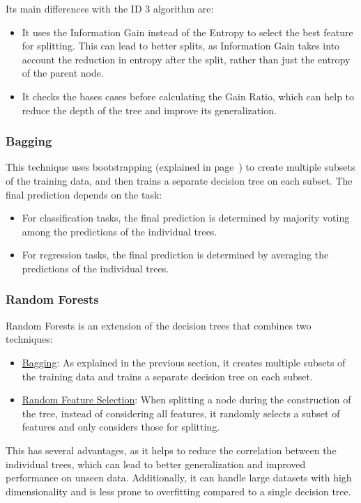 Its main differences with the ID 3 algorithm are:
\begin{itemize}
    \item It uses the Information Gain instead of the Entropy to select the best feature for splitting. This can lead to better splits, as Information Gain takes into account the reduction in entropy after the split, rather than just the entropy of the parent node.
    \item It checks the bases cases before calculating the Gain Ratio, which can help to reduce the depth of the tree and improve its generalization.
\end{itemize}

\subsubsection{Bagging}

This technique uses bootstrapping (explained in page~\pageref{sec:bootstrapping}) to create multiple subsets of the training data, and then trains a separate decision tree on each subset. The final prediction depends on the task:
\begin{itemize}
    \item For classification tasks, the final prediction is determined by majority voting among the predictions of the individual trees.
    \item For regression tasks, the final prediction is determined by averaging the predictions of the individual trees.
\end{itemize}

\subsubsection{Random Forests}

Random Forests is an extension of the decision trees that combines two techniques:
\begin{itemize}
    \item \ul{Bagging}: As explained in the previous section, it creates multiple subsets of the training data and trains a separate decision tree on each subset.
    \item \ul{Random Feature Selection}: When splitting a node during the construction of the tree, instead of considering all features, it randomly selects a subset of features and only considers those for splitting.
\end{itemize}

This has several advantages, as it helps to reduce the correlation between the individual trees, which can lead to better generalization and improved performance on unseen data. Additionally, it can handle large datasets with high dimensionality and is less prone to overfitting compared to a single decision tree.